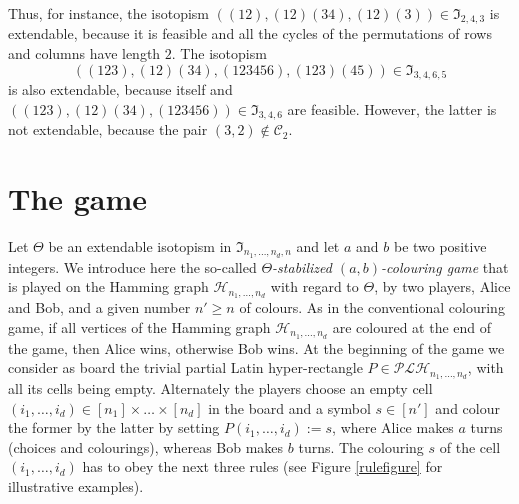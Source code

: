 \documentclass{article}
\begin{document}
\vspace{0.1cm}

Thus, for instance, the isotopism $((12),(12)(34),(12)(3))\in\mathfrak{I}_{2,4,3}$ is extendable, because it is feasible and all the cycles of the permutations of rows and columns 
have length $2$. The isotopism 
\[((123),(12)(34),(123456),(123)(45))\in\mathfrak{I}_{3,4,6,5}\] 
is also extendable, because itself and 
$((123),(12)(34),(123456))\in\mathfrak{I}_{3,4,6}$ are feasible. However, the latter is  not extendable, because the pair $(3,2)\not\in\mathcal{C}_2$.

\section{The game}\label{secgame}

 Let $\Theta$ be an extendable isotopism in $\mathfrak{I}_{n_1,\ldots, n_d,n}$ and let $a$ and $b$ be two positive integers. We introduce here the so-called \emph{$\Theta$-stabilized $(a,b)$-colouring game} that is 
 played on the Hamming graph $\mathcal{H}_{n_1,\ldots, n_d}$ with regard to $\Theta$, by two players, Alice and Bob, and a given number $n'\ge n$ of colours. As in the conventional colouring game, if all vertices of the 
 Hamming graph $\mathcal{H}_{n_1,\ldots, n_d}$ are coloured at the end of the game, then Alice wins, otherwise Bob wins. At the beginning of the game we consider as board the trivial partial Latin hyper-rectangle 
 \mbox{$P\in\mathcal{PLH}_{n_1,\ldots, n_d}$}, with all its cells being empty. Alternately the players choose an empty cell $(i_1,\ldots,i_d)\in [n_1]\times\ldots\times [n_d]$ in the board and a symbol $s\in [n']$ and 
colour 
 the former by the latter by setting $P(i_1,\ldots,i_d):=s$, where Alice makes $a$ turns (choices and colourings), whereas Bob makes $b$ turns. The colouring $s$ of the cell $(i_1,\ldots,i_d)$ has to obey the next three 
 rules (see Figure \ref{rulefigure} for illustrative examples).
\end{document}
